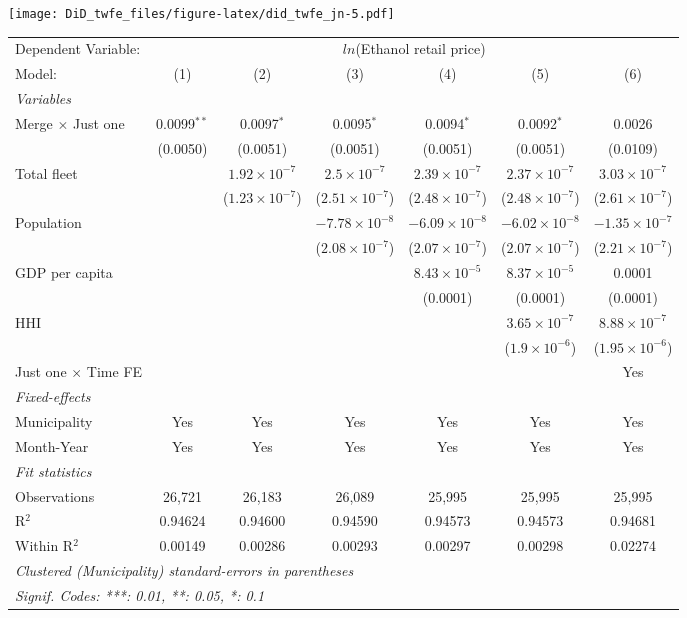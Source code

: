 \documentclass[
]{article}
\begin{document}
\texttt{[image: DiD\_twfe\_files/figure-latex/did\_twfe\_jn-5.pdf]}

\begin{tabular}{lcccccc}
\tabularnewline\midrule\midrule
Dependent Variable:&\multicolumn{6}{c}{$ln$(Ethanol retail price)}\\
Model:&(1) & (2) & (3) & (4) & (5) & (6)\\
\midrule \emph{Variables}&   &   &   &   &   &  \\
Merge $\times $ Just one & 0.0099$^{**}$ & 0.0097$^{*}$ & 0.0095$^{*}$ & 0.0094$^{*}$ & 0.0092$^{*}$ & 0.0026\\
  &(0.0050) & (0.0051) & (0.0051) & (0.0051) & (0.0051) & (0.0109)\\
Total fleet &    & $1.92\times 10^{-7}$ & $2.5\times 10^{-7}$ & $2.39\times 10^{-7}$ & $2.37\times 10^{-7}$ & $3.03\times 10^{-7}$\\
  &   & ($1.23\times 10^{-7}$) & ($2.51\times 10^{-7}$) & ($2.48\times 10^{-7}$) & ($2.48\times 10^{-7}$) & ($2.61\times 10^{-7}$)\\
Population &    &    & $-7.78\times 10^{-8}$ & $-6.09\times 10^{-8}$ & $-6.02\times 10^{-8}$ & $-1.35\times 10^{-7}$\\
  &   &    & ($2.08\times 10^{-7}$) & ($2.07\times 10^{-7}$) & ($2.07\times 10^{-7}$) & ($2.21\times 10^{-7}$)\\
GDP per capita &    &    &    & $8.43\times 10^{-5}$ & $8.37\times 10^{-5}$ & 0.0001\\
  &   &    &    & (0.0001) & (0.0001) & (0.0001)\\
HHI &    &    &    &    & $3.65\times 10^{-7}$ & $8.88\times 10^{-7}$\\
  &   &    &    &    & ($1.9\times 10^{-6}$) & ($1.95\times 10^{-6}$)\\
Just one $\times$ Time FE &  &  &  &  &  & Yes\\
\midrule \emph{Fixed-effects}&   &   &   &   &   &  \\
Municipality & Yes & Yes & Yes & Yes & Yes & Yes\\
Month-Year & Yes & Yes & Yes & Yes & Yes & Yes\\
\midrule \emph{Fit statistics}&  & & & & & \\
Observations & 26,721&26,183&26,089&25,995&25,995&25,995\\
R$^2$ & 0.94624&0.94600&0.94590&0.94573&0.94573&0.94681\\
Within R$^2$ & 0.00149&0.00286&0.00293&0.00297&0.00298&0.02274\\
\midrule\midrule\multicolumn{7}{l}{\emph{Clustered (Municipality) standard-errors in parentheses}}\\
\multicolumn{7}{l}{\emph{Signif. Codes: ***: 0.01, **: 0.05, *: 0.1}}\\
\end{tabular}
\end{document}
